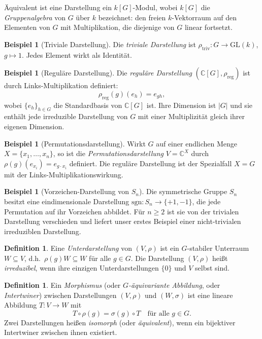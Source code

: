 \documentclass[12pt,a4paper]{amsart}
\theoremstyle{definition}
\newtheorem{definition}[theorem]{Definition}
\newtheorem{beispiel}[theorem]{Beispiel}
\begin{document}
Äquivalent ist eine Darstellung ein $k[G]$-Modul, wobei $k[G]$ die
\emph{Gruppenalgebra} von $G$ über $k$ bezeichnet: den freien $k$-Vektorraum auf
den Elementen von $G$ mit Multiplikation, die diejenige von $G$ linear fortsetzt.

\begin{beispiel}[Triviale Darstellung]
Die \emph{triviale Darstellung} ist $\rho_{\mathrm{triv}} \colon G \to
\mathrm{GL}(k)$, $g \mapsto 1$.  Jedes Element wirkt als Identität.
\end{beispiel}

\begin{beispiel}[Reguläre Darstellung]
Die \emph{reguläre Darstellung} $(\mathbb{C}[G], \rho_{\mathrm{reg}})$ ist durch
Links-Multiplikation definiert:
\[
    \rho_{\mathrm{reg}}(g)(e_h) = e_{gh},
\]
wobei $\{e_h\}_{h \in G}$ die Standardbasis von $\mathbb{C}[G]$ ist.  Ihre
Dimension ist $|G|$ und sie enthält jede irreduzible Darstellung von $G$ mit einer
Multiplizität gleich ihrer eigenen Dimension.
\end{beispiel}

\begin{beispiel}[Permutationsdarstellung]
Wirkt $G$ auf einer endlichen Menge $X = \{x_1,\ldots,x_n\}$, so ist die
\emph{Permutationsdarstellung} $V = \mathbb{C}^X$ durch
$\rho(g)(e_{x_i}) = e_{g \cdot x_i}$ definiert.  Die reguläre Darstellung ist
der Spezialfall $X = G$ mit der Links-Multiplikationswirkung.
\end{beispiel}

\begin{beispiel}[Vorzeichen-Darstellung von $S_n$]
Die symmetrische Gruppe $S_n$ besitzt eine eindimensionale Darstellung
$\mathrm{sgn} \colon S_n \to \{+1,-1\}$, die jede Permutation auf ihr Vorzeichen
abbildet.  Für $n \geq 2$ ist sie von der trivialen Darstellung verschieden und
liefert unser erstes Beispiel einer nicht-trivialen irreduziblen Darstellung.
\end{beispiel}

\begin{definition}
Eine \emph{Unterdarstellung} von $(V,\rho)$ ist ein $G$-stabiler Unterraum
$W \subseteq V$, d.h.\ $\rho(g)W \subseteq W$ für alle $g \in G$.  Die
Darstellung $(V,\rho)$ heißt \emph{irreduzibel}, wenn ihre einzigen
Unterdarstellungen $\{0\}$ und $V$ selbst sind.
\end{definition}

\begin{definition}
Ein \emph{Morphismus} (oder \emph{$G$-äquivariante Abbildung}, oder
\emph{Intertwiner}) zwischen Darstellungen $(V,\rho)$ und $(W,\sigma)$ ist
eine lineare Abbildung $T \colon V \to W$ mit
\[
    T \circ \rho(g) = \sigma(g) \circ T \quad \text{für alle } g \in G.
\]
Zwei Darstellungen heißen \emph{isomorph} (oder \emph{äquivalent}), wenn
ein bijektiver Intertwiner zwischen ihnen existiert.
\end{definition}
\end{document}
